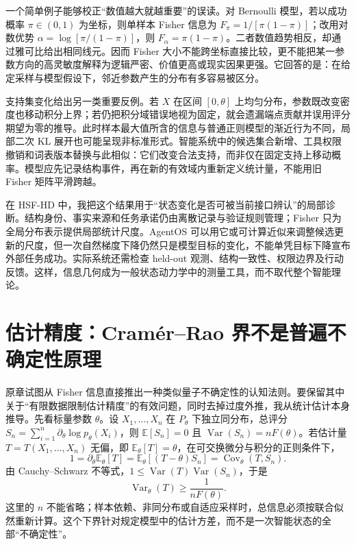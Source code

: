 一个简单例子能够校正“数值越大就越重要”的误读。对 Bernoulli 模型，若以成功概率 $\pi\in(0,1)$ 为坐标，则单样本 Fisher 信息为 $F_\pi=1/[\pi(1-\pi)]$；改用对数优势 $\alpha=\log[\pi/(1-\pi)]$，则 $F_\alpha=\pi(1-\pi)$。二者数值趋势相反，却通过雅可比给出相同线元。因而 Fisher 大小不能跨坐标直接比较，更不能把某一参数方向的高灵敏度解释为逻辑严密、价值更高或现实因果更强。它回答的是：在给定采样与模型假设下，邻近参数产生的分布有多容易被区分。

支持集变化给出另一类重要反例。若 $X$ 在区间 $[0,\theta]$ 上均匀分布，参数既改变密度也移动积分上界；若仍把积分域错误地视为固定，就会遗漏端点贡献并误用评分期望为零的推导。此时样本最大值所含的信息与普通正则模型的渐近行为不同，局部二次 KL 展开也可能呈现非标准形式。智能系统中的候选集合新增、工具权限撤销和词表版本替换与此相似：它们改变合法支持，而非仅在固定支持上移动概率。模型应先记录结构事件，再在新的有效域内重新定义统计量，不能用旧 Fisher 矩阵平滑跨越。

在 HSF-HD 中，我把这个结果用于“状态变化是否可被当前接口辨认”的局部诊断。结构身份、事实来源和任务承诺仍由离散记录与验证规则管理；Fisher 只为全局分布表示提供局部统计尺度。AgentOS 可以用它或可计算近似来调整候选更新的尺度，但一次自然梯度下降仍然只是模型目标的变化，不能单凭目标下降宣布外部任务成功。实际系统还需检查 held-out 观测、结构一致性、权限边界及行动反馈。这样，信息几何成为一般状态动力学中的测量工具，而不取代整个智能理论。

\section{估计精度：Cramér--Rao 界不是普遍不确定性原理}
\label{sec:geometry_of_measurement_crlb}

原章试图从 Fisher 信息直接推出一种类似量子不确定性的认知法则。要保留其中关于“有限数据限制估计精度”的有效问题，同时去掉过度外推，我从统计估计本身推导。先看标量参数 $\theta$。设 $X_1,\ldots,X_n$ 在 $P_\theta$ 下独立同分布，总评分 $S_n=\sum_{i=1}^n\partial_\theta\log p_\theta(X_i)$，则 $\mathbb E[S_n]=0$ 且 $\operatorname{Var}(S_n)=nF(\theta)$。若估计量 $T=T(X_1,\ldots,X_n)$ 无偏，即 $\mathbb E_\theta[T]=\theta$，在可交换微分与积分的正则条件下，
\begin{equation}
    1=\partial_\theta\mathbb E_\theta[T]
    =\mathbb E_\theta[(T-\theta)S_n]
    =\operatorname{Cov}_\theta(T,S_n).
\end{equation}
由 Cauchy--Schwarz 不等式，$1\leq\operatorname{Var}(T)\operatorname{Var}(S_n)$，于是
\begin{equation}
    \operatorname{Var}_\theta(T)\geq\frac{1}{nF(\theta)}.
\end{equation}
这里的 $n$ 不能省略；样本依赖、非同分布或自适应采样时，总信息必须按联合似然重新计算。这个下界针对规定模型中的估计方差，而不是一次智能状态的全部“不确定性”。

